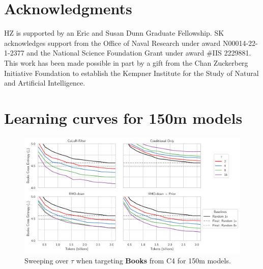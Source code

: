 \documentclass{article}
\begin{document}
\section*{Acknowledgments}

HZ is supported by an Eric and Susan Dunn Graduate Fellowship. SK acknowledges support from the Office of Naval Research under award N00014-22-1-2377 and the National Science Foundation Grant under award \#IIS 2229881. This work has been made possible in part by a gift from the Chan Zuckerberg Initiative Foundation to establish the Kempner Institute for the Study of Natural and Artificial Intelligence.




\newpage
\appendix




\section{Learning curves for 150m models}\label{app:curves}

\begin{figure}[h]
    \centering
    \includegraphics[width=\textwidth]{images/books_lcs.pdf}
    \caption{Sweeping over $ \tau$ when targeting \textbf{Books} from C4 for 150m models.}
    \label{fig:books}
\end{figure}
\end{document}
